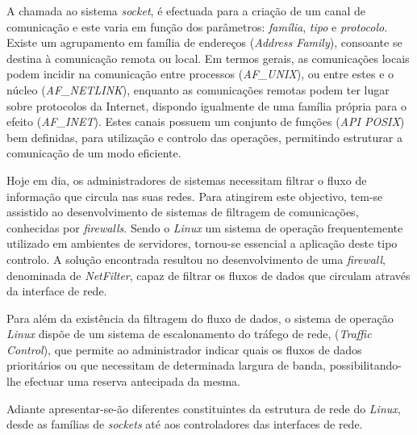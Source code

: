 A chamada ao sistema \textit{socket}, é efectuada para a criação de um canal de comunicação e este varia em função dos parâmetros: \textit{família}, \textit{tipo} e \textit{protocolo}.
Existe um agrupamento em família de endereços (\textit{Address Family}), consoante se destina à comunicação remota ou local.
Em termos gerais, as comunicações locais podem incidir na comunicação entre processos (\textit{AF\_UNIX}), ou entre estes e o núcleo (\textit{AF\_NETLINK}), enquanto as comunicações remotas podem ter lugar sobre protocolos da Internet, dispondo igualmente de uma família própria para o efeito (\textit{AF\_INET}).
Estes canais possuem um conjunto de funções (\textit{API POSIX}) bem definidas, para utilização e controlo das operações, permitindo estruturar a comunicação de um modo eficiente.



Hoje em dia, os administradores de sistemas necessitam filtrar o fluxo de informação que circula nas suas redes.
Para atingirem este objectivo, tem-se assistido ao desenvolvimento de sistemas de filtragem de comunicações, conhecidas por \textit{firewalls}.
Sendo o \textit{Linux} um sistema de operação frequentemente utilizado em ambientes de servidores, tornou-se essencial a aplicação deste tipo controlo.
A solução encontrada resultou no desenvolvimento de uma \textit{firewall}, denominada de \textit{NetFilter}, capaz de filtrar os fluxos de dados que circulam através da interface de rede.

Para além da existência da filtragem do fluxo de dados, o sistema de operação \textit{Linux} dispõe de um sistema de escalonamento do tráfego de rede, (\textit{Traffic Control}), que permite ao administrador indicar quais os fluxos de dados prioritários ou que necessitam de determinada largura de banda, possibilitando-lhe efectuar uma reserva antecipada da mesma.
 
Adiante apresentar-se-ão diferentes constituintes da estrutura de rede do \textit{Linux}, desde as famílias de \textit{sockets} até aos controladores das interfaces de rede.

